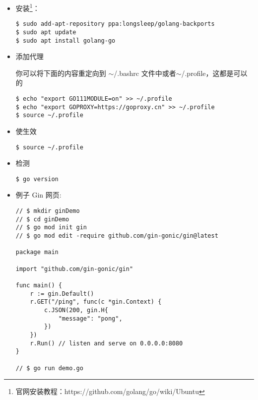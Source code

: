 \begin{itemize}
\item 安装\footnote{官网安装教程：https://github.com/golang/go/wiki/Ubuntu}：
\begin{lstlisting}
$ sudo add-apt-repository ppa:longsleep/golang-backports
$ sudo apt update
$ sudo apt install golang-go
\end{lstlisting}
	
\item 添加代理

你可以将下面的内容重定向到 $\sim$/.bashrc 文件中或者$\sim$/.profile，这都是可以的
\begin{lstlisting}
$ echo "export GO111MODULE=on" >> ~/.profile
$ echo "export GOPROXY=https://goproxy.cn" >> ~/.profile
$ source ~/.profile
\end{lstlisting}

\item 使生效
\begin{lstlisting}
$ source ~/.profile
\end{lstlisting}
	
\item 检测
\begin{lstlisting}
$ go version
\end{lstlisting}

\item 例子 Gin 网页: 

\begin{lstlisting}
// $ mkdir ginDemo
// $ cd ginDemo 
// $ go mod init gin	
// $ go mod edit -require github.com/gin-gonic/gin@latest	
	
package main

import "github.com/gin-gonic/gin"

func main() {
	r := gin.Default()
	r.GET("/ping", func(c *gin.Context) {
		c.JSON(200, gin.H{
			"message": "pong",
		})
	})
	r.Run() // listen and serve on 0.0.0.0:8080
}

// $ go run demo.go 
\end{lstlisting}
\end{itemize}

